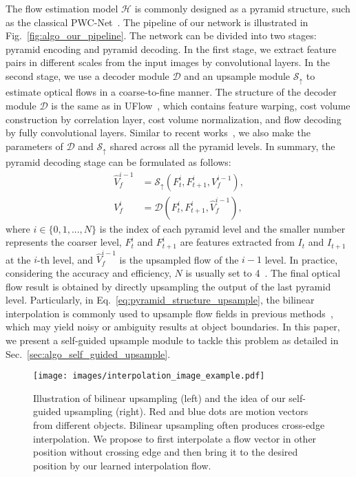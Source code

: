 \documentclass[final]{cvpr}
\begin{document}
The flow estimation model $\mathcal{H}$ is commonly designed as a pyramid structure, such as the classical PWC-Net~\cite{pwc_net}. The pipeline of our network is illustrated in Fig.~\ref{fig:algo_our_pipeline}. 
The network can be divided into two stages: pyramid encoding and pyramid decoding. 
In the first stage, we extract feature pairs in different scales from the input images by convolutional layers. 
In the second stage, we use a decoder module $\mathcal{D}$ and an upsample module $\mathcal{S}_{\uparrow}$ to estimate optical flows in a coarse-to-fine manner. 
The structure of the decoder module $\mathcal{D}$ is the same as in UFlow~\cite{jonschkowski2020matters}, which contains feature warping, cost volume construction by correlation layer, cost volume normalization, and flow decoding by fully convolutional layers. Similar to recent works~\cite{irrpwc,jonschkowski2020matters}, we also make the parameters of $\mathcal{D}$ and $\mathcal{S}_{\uparrow}$ shared across all the pyramid levels. In summary, the pyramid decoding stage can be formulated as follows: 
\begin{align}
	\hat{V}_{f}^{i-1} & =  \mathcal{S}_{\uparrow}(F_{t}^{i},F_{t+1}^{i},V_{f}^{i-1}),  \label{eq:pyramid_structure_upsample} \\
	V_{f}^{i} & =\mathcal{D}(F_{t}^{i},F_{t+1}^{i},\hat{V}_{f}^{i-1}),  \label{eq:pyramid_structure_decode}
\end{align}
where $i\in \{0,1,...,N\}$ is the index of each pyramid level and the smaller number represents the coarser level, $F_{t}^{i}$ and $F_{t+1}^{i}$ are features extracted from $I_t$ and $I_{t+1}$ at the $i$-th level, and $\hat{V}_{f}^{i-1}$ is the upsampled flow of the $i-1$ level. 
In practice, considering the accuracy and efficiency, $N$ is usually set to 4~\cite{irrpwc,pwc_net}. The final optical flow result is obtained by directly upsampling the output of the last pyramid level. 
Particularly, in Eq.~\ref{eq:pyramid_structure_upsample}, the bilinear interpolation is commonly used to upsample flow fields in previous methods~\cite{irrpwc,jonschkowski2020matters}, which may yield noisy or ambiguity results at object boundaries. In this paper, we present a self-guided upsample module to tackle this problem as detailed in Sec.~\ref{sec:algo_self_guided_upsample}. 

\begin{figure}
	\centering
	\texttt{[image: images/interpolation\_image\_example.pdf]}
	\caption{
		Illustration of bilinear upsampling (left) and the idea of our self-guided upsampling (right). Red and blue dots are motion vectors from different objects.
		Bilinear upsampling often produces cross-edge interpolation. We propose to first interpolate a flow vector in other position without crossing edge and then bring it to the desired position by our learned interpolation flow. 
	}\label{fig:algo_self_guided_interpolation_}
\end{figure}
\end{document}
